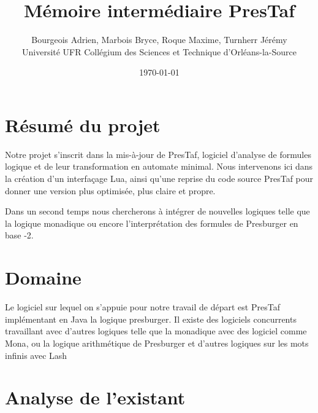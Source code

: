 \documentclass{article}%
\begin{document}
\title{Mémoire intermédiaire PresTaf}

\author{Bourgeois Adrien, Marbois Bryce, Roque Maxime, Turnherr Jérémy%
\\Université UFR Collégium des Sciences et Technique d'Orléans-la-Source}
\date{\today}
\maketitle



\clearpage

\tableofcontents

\cleardoublepage

\section{Résumé du projet}

Notre projet s'inscrit dans la mis-à-jour de PresTaf, logiciel d'analyse de formules logique et de leur transformation en automate minimal. Nous intervenons ici dans la création d'un interfaçage Lua, ainsi qu'une reprise du code source PresTaf pour donner une version plus optimisée, plus claire et propre.\\\par

Dans un second temps nous chercherons à intégrer de nouvelles logiques telle que la logique monadique ou encore l'interprétation des formules de Presburger en base -2.

\section{Domaine}

Le logiciel sur lequel on s'appuie pour notre travail de départ est PresTaf implémentant en Java la logique \gls{presburger}\cite{ginsburg1966semigroups}. Il existe des logiciels concurrents travaillant avec d'autres logiques telle que la \gls{monadique}\cite{KlaEtAl:Mona} avec des logiciel comme Mona\cite{monamanual2001}, ou la logique arithmétique de Presburger et d'autres logiques sur les mots infinis avec Lash\cite{lash}

\section{Analyse de l'existant}
\end{document}
